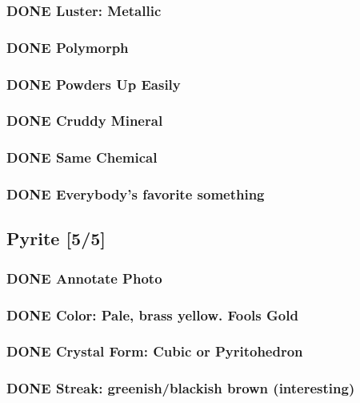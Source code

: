 \documentclass[11pt]{article}
\begin{document}
\subsubsection{{\bfseries\sffamily DONE} Luster: Metallic}
\label{sec-2-2-3}
\subsubsection{{\bfseries\sffamily DONE} Polymorph}
\label{sec-2-2-4}
\subsubsection{{\bfseries\sffamily DONE} Powders Up Easily}
\label{sec-2-2-5}
\subsubsection{{\bfseries\sffamily DONE} Cruddy Mineral}
\label{sec-2-2-6}
\subsubsection{{\bfseries\sffamily DONE} Same Chemical}
\label{sec-2-2-7}
\subsubsection{{\bfseries\sffamily DONE} Everybody's favorite something}
\label{sec-2-2-8}
\subsection{Pyrite [5/5]}
\label{sec-2-3}
\subsubsection{{\bfseries\sffamily DONE} Annotate Photo}
\label{sec-2-3-1}
\subsubsection{{\bfseries\sffamily DONE} Color: Pale, brass yellow. Fools Gold}
\label{sec-2-3-2}
\subsubsection{{\bfseries\sffamily DONE} Crystal Form: Cubic or Pyritohedron}
\label{sec-2-3-3}
\subsubsection{{\bfseries\sffamily DONE} Streak: greenish/blackish brown (interesting)}
\label{sec-2-3-4}
\end{document}
